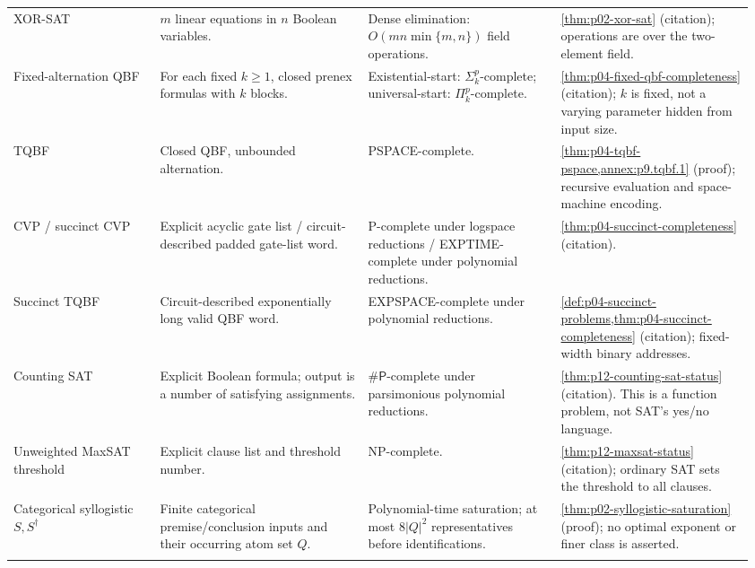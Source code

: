 \begin{landscape}
\begin{longtable}{@{}p{0.19\linewidth}p{0.27\linewidth}p{0.25\linewidth}p{0.25\linewidth}@{}}
XOR-SAT & \(m\) linear equations in \(n\) Boolean variables. & Dense elimination: \(O(mn\min\{m,n\})\) field operations. & \cref{thm:p02-xor-sat} (citation); operations are over the two-element field.\\\addlinespace
Fixed-alternation QBF & For each fixed \(k\geq1\), closed prenex formulas with \(k\) blocks. & Existential-start: \(\Sigma_k^p\)-complete; universal-start: \(\Pi_k^p\)-complete. & \cref{thm:p04-fixed-qbf-completeness} (citation); \(k\) is fixed, not a varying parameter hidden from input size.\\\addlinespace
TQBF & Closed QBF, unbounded alternation. & PSPACE-complete. & \cref{thm:p04-tqbf-pspace,annex:p9.tqbf.1} (proof); recursive evaluation and space-machine encoding.\\\addlinespace
CVP / succinct CVP & Explicit acyclic gate list / circuit-described padded gate-list word. & P-complete under logspace reductions / EXPTIME-complete under polynomial reductions. & \cref{thm:p04-succinct-completeness} (citation).\\\addlinespace
Succinct TQBF & Circuit-described exponentially long valid QBF word. & EXPSPACE-complete under polynomial reductions. & \cref{def:p04-succinct-problems,thm:p04-succinct-completeness} (citation); fixed-width binary addresses.\\\addlinespace
Counting SAT & Explicit Boolean formula; output is a number of satisfying assignments. & \(\#\mathsf P\)-complete under parsimonious polynomial reductions. & \cref{thm:p12-counting-sat-status} (citation). This is a function problem, not SAT's yes/no language.\\\addlinespace
Unweighted MaxSAT threshold & Explicit clause list and threshold number. & NP-complete. & \cref{thm:p12-maxsat-status} (citation); ordinary SAT sets the threshold to all clauses.\\\addlinespace
Categorical syllogistic \(S,S^\dagger\) & Finite categorical premise/conclusion inputs and their occurring atom set \(Q\). & Polynomial-time saturation; at most \(8|Q|^2\) representatives before identifications. & \cref{thm:p02-syllogistic-saturation} (proof); no optimal exponent or finer class is asserted.\\\addlinespace
\end{longtable}
\endgroup
\end{landscape}

